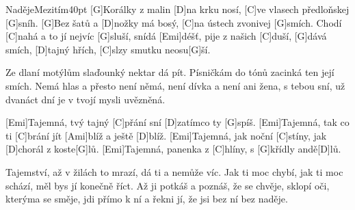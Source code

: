 \begin{song}{Naděje}{Mezitím}{40pt}
%
[G]Korálky z malin [D]na krku nosí, [C]ve vlasech předloňskej [G]sníh.
[G]Bez šatů a [D]nožky má bosý, [C]na ústech zvonivej [G]smích.
\rl Chodí [C]nahá a to jí nejvíc [G]sluší, snídá [Emi]déšť, pije z našich [C]duší,
[G]dává smích, [D]tajný hřích, [C]slzy smutku neosu[G]{}ší.\rr{}

%
Ze dlaní motýlům slaďounký nektar dá pít.
Písničkám do tónů zacinká ten její smích.
\rl Nemá hlas a přesto není němá, není dívka a není ani žena,
s tebou sní, už dvanáct dní je v tvojí mysli uvězněná.\rr{}

\verse{*}%
[Emi]Tajemná, tvý tajný [C]přání sní [D]zatímco ty [G]spíš.
[Emi]Tajemná, tak co ti [C]brání jít [Ami]blíž a ještě [D]blíž.
[Emi]Tajemná, jak noční [C]stíny, jak [D]chorál z koste[G]lů.
[Emi]Tajemná, panenka z [C]hlíny, s [G]křídly andě[D]lů.

%
Tajemství, až v žilách to mrazí, dá ti a nemůže víc.
Jak ti moc chybí, jak ti moc schází, měl bys jí konečně říct.
\rl Až ji potkáš a poznáš, že se chvěje, sklopí oči, kterýma se směje,
jdi přímo k ní a řekni jí, že jsi bez ní bez naděje.\rr{}
\end{song}
